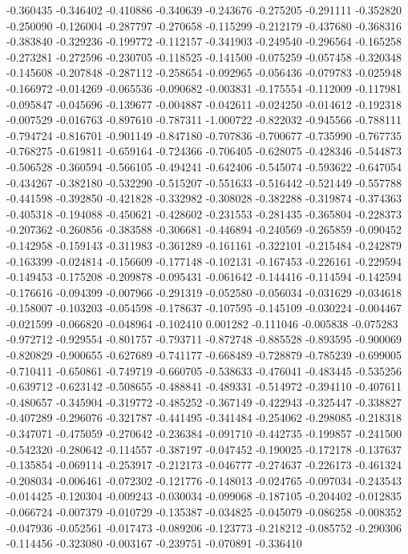 -0.360435
-0.346402
-0.410886
-0.340639
-0.243676
-0.275205
-0.291111
-0.352820
-0.250090
-0.126004
-0.287797
-0.270658
-0.115299
-0.212179
-0.437680
-0.368316
-0.383840
-0.329236
-0.199772
-0.112157
-0.341903
-0.249540
-0.296564
-0.165258
-0.273281
-0.272596
-0.230705
-0.118525
-0.141500
-0.075259
-0.057458
-0.320348
-0.145608
-0.207848
-0.287112
-0.258654
-0.092965
-0.056436
-0.079783
-0.025948
-0.166972
-0.014269
-0.065536
-0.090682
-0.003831
-0.175554
-0.112009
-0.117981
-0.095847
-0.045696
-0.139677
-0.004887
-0.042611
-0.024250
-0.014612
-0.192318
-0.007529
-0.016763
-0.897610
-0.787311
-1.000722
-0.822032
-0.945566
-0.788111
-0.794724
-0.816701
-0.901149
-0.847180
-0.707836
-0.700677
-0.735990
-0.767735
-0.768275
-0.619811
-0.659164
-0.724366
-0.706405
-0.628075
-0.428346
-0.544873
-0.506528
-0.360594
-0.566105
-0.494241
-0.642406
-0.545074
-0.593622
-0.647054
-0.434267
-0.382180
-0.532290
-0.515207
-0.551633
-0.516442
-0.521449
-0.557788
-0.441598
-0.392850
-0.421828
-0.332982
-0.308028
-0.382288
-0.319874
-0.374363
-0.405318
-0.194088
-0.450621
-0.428602
-0.231553
-0.281435
-0.365804
-0.228373
-0.207362
-0.260856
-0.383588
-0.306681
-0.446894
-0.240569
-0.265859
-0.090452
-0.142958
-0.159143
-0.311983
-0.361289
-0.161161
-0.322101
-0.215484
-0.242879
-0.163399
-0.024814
-0.156609
-0.177148
-0.102131
-0.167453
-0.226161
-0.229594
-0.149453
-0.175208
-0.209878
-0.095431
-0.061642
-0.144416
-0.114594
-0.142594
-0.176616
-0.094399
-0.007966
-0.291319
-0.052580
-0.056034
-0.031629
-0.034618
-0.158007
-0.103203
-0.054598
-0.178637
-0.107595
-0.145109
-0.030224
-0.004467
-0.021599
-0.066820
-0.048964
-0.102410
0.001282
-0.111046
-0.005838
-0.075283
-0.972712
-0.929554
-0.801757
-0.793711
-0.872748
-0.885528
-0.893595
-0.900069
-0.820829
-0.900655
-0.627689
-0.741177
-0.668489
-0.728879
-0.785239
-0.699005
-0.710411
-0.650861
-0.749719
-0.660705
-0.538633
-0.476041
-0.483445
-0.535256
-0.639712
-0.623142
-0.508655
-0.488841
-0.489331
-0.514972
-0.394110
-0.407611
-0.480657
-0.345904
-0.319772
-0.485252
-0.367149
-0.422943
-0.325447
-0.338827
-0.407289
-0.296076
-0.321787
-0.441495
-0.341484
-0.254062
-0.298085
-0.218318
-0.347071
-0.475059
-0.270642
-0.236384
-0.091710
-0.442735
-0.199857
-0.241500
-0.542320
-0.280642
-0.114557
-0.387197
-0.047452
-0.190025
-0.172178
-0.137637
-0.135854
-0.069114
-0.253917
-0.212173
-0.046777
-0.274637
-0.226173
-0.461324
-0.208034
-0.006461
-0.072302
-0.121776
-0.148013
-0.024765
-0.097034
-0.243543
-0.014425
-0.120304
-0.009243
-0.030034
-0.099068
-0.187105
-0.204402
-0.012835
-0.066724
-0.007379
-0.010729
-0.135387
-0.034825
-0.045079
-0.086258
-0.008352
-0.047936
-0.052561
-0.017473
-0.089206
-0.123773
-0.218212
-0.085752
-0.290306
-0.114456
-0.323080
-0.003167
-0.239751
-0.070891
-0.336410
